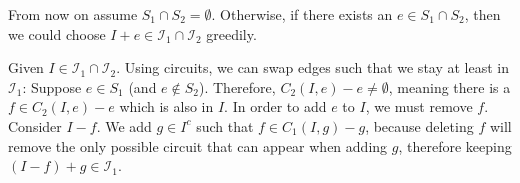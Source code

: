 \begin{example}
\begin{minipage}{\textwidth}
\begin{tikzpicture}
        \end{tikzpicture}
    \end{minipage}
\end{example}
\begin{assumption}
    From now on assume $S_1 \cap S_2 = \emptyset$.
    Otherwise, if there exists an $e \in S_1 \cap S_2$, then we could choose $I+e \in \mathcal I_1 \cap \mathcal I_2$ greedily.
\end{assumption}
\begin{observe}
    Given $I \in \mathcal I_1 \cap \mathcal I_2$.
    Using circuits, we can swap edges such that we stay at least in $\mathcal I_1$:
    Suppose $e \in S_1$ (and $e \not \in S_2$). Therefore, $C_2(I,e)-e \neq \emptyset$,
    meaning there is a $f \in C_2(I,e)-e$ which is also in $I$.
    In order to add $e$ to $I$, we must remove $f$.
    Consider $I - f$. We add $g \in I^c$ such that $f \in C_1(I,g) - g$, because
    deleting $f$ will remove the only possible circuit that can appear when adding $g$,
    therefore keeping $(I-f)+g \in \mathcal I_1$.
\end{observe}


